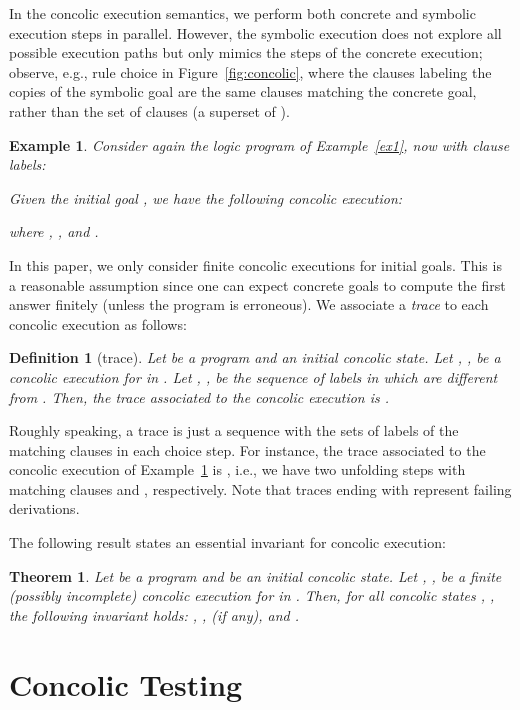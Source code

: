 \documentclass[fleqn]{tlp}
\newtheorem{definition}{Definition} \newtheorem{example}{Example} \newtheorem{lemma}{Lemma} \newtheorem{proposition}{Proposition} \newtheorem{theorem}{Theorem} \newtheorem{corollary}{Corollary}
\begin{document}
In the concolic execution semantics, we perform both concrete and
symbolic execution steps in parallel. However, the symbolic execution
does not explore all possible execution paths but only mimics the
steps of the concrete execution; observe, e.g., rule \textsf{choice}
in Figure~\ref{fig:concolic}, where the clauses labeling the copies of
the symbolic goal are the same clauses  matching the
concrete goal, rather than the set of clauses  (a superset
of ).

\begin{example} \label{ex2} 
  Consider again the logic program of Example~\ref{ex1}, now with
  clause labels:
  
    Given the initial goal , we have the following concolic
    execution:
    
    where , , and
    .
\end{example}
In this paper, we only consider finite concolic executions for initial
goals.  This is a reasonable assumption since one can expect concrete
goals to compute the first answer finitely (unless the program is
erroneous).
We associate a \emph{trace} to each concolic execution as follows:

\begin{definition}[trace]
  Let  be a program and  an initial concolic state. Let , , be a
  concolic execution for  in . Let
  , , be the
  sequence of labels in  which are different from
  . Then, the trace associated to the concolic execution 
  is .
\end{definition}
Roughly speaking, a trace is just a sequence with the sets of labels
of the matching clauses in each choice step.
For instance, the trace associated to the concolic execution of
Example~\ref{ex2} is , i.e., we have
two unfolding steps with matching clauses  and
, respectively.
Note that traces ending with  represent failing derivations.

The following result states an essential invariant for concolic execution:

\begin{theorem} \label{th:invariant} Let  be a program and  be an initial
  concolic state. Let , ,
  be a finite (possibly incomplete) concolic execution for  in
  . Then, for all concolic states , , the following
  invariant holds: , ,  (if any), and
  .
\end{theorem}

\section{Concolic Testing} \label{testing}
\end{document}
